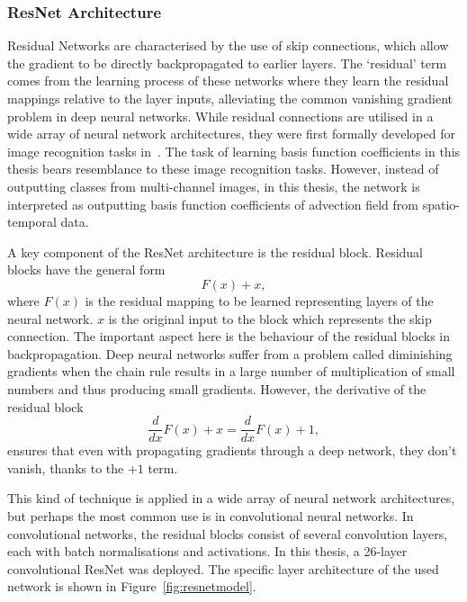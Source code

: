 \subsubsection{ResNet Architecture}
Residual Networks are characterised by the use of skip connections, which allow the gradient to be directly backpropagated to earlier layers.
The ‘residual’ term comes from the learning process of these networks where they learn the residual mappings relative to the layer inputs, alleviating the common vanishing gradient problem in deep neural networks.
While residual connections are utilised in a wide array of neural network architectures, they were first formally developed for image recognition tasks in~\cite{resnet}.
The task of learning basis function coefficients in this thesis bears resemblance to these image recognition tasks.
However, instead of outputting classes from multi-channel images, in this thesis, the network is interpreted as outputting basis function coefficients of advection field from spatio-temporal data.

A key component of the ResNet architecture is the residual block.
Residual blocks have the general form
\begin{equation}\label{eq:residualblock}
    F(x) + x,
\end{equation}
where $F(x)$ is the residual mapping to be learned representing layers of the neural network. $x$ is the original input to the block which represents the skip connection.
The important aspect here is the behaviour of the residual blocks in backpropagation.
Deep neural networks suffer from a problem called diminishing gradients when the chain rule results in a large number of multiplication of small numbers and thus producing small gradients.
However, the derivative of the residual block
\begin{equation}\label{eq:residualblockderivative}
    \frac{d}{dx} F(x) + x = \frac{d}{dx} F(x) + 1,
\end{equation}
ensures that even with propagating gradients through a deep network, they don't vanish, thanks to the $+1$ term.

This kind of technique is applied in a wide array of neural network architectures, but perhaps the most common use is in convolutional neural networks.
In convolutional networks, the residual blocks consist of several convolution layers, each with batch normalisations and activations.
In this thesis, a 26-layer convolutional ResNet was deployed.
The specific layer architecture of the used network is shown in Figure~\ref{fig:resnetmodel}.

